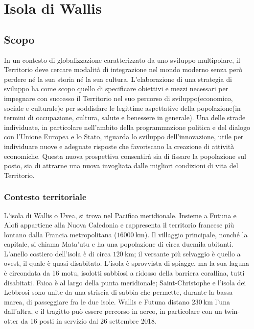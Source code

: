 \documentclass[fleqn,10pt]{SelfArx} %
\begin{document}
\maketitle 

\tableofcontents 

\thispagestyle{empty} %

\section{Isola di Wallis}

\subsection{Scopo}
In un contesto di globalizzazione caratterizzato da uno sviluppo multipolare, il Territorio deve cercare modalità di integrazione nel mondo moderno senza però perdere né la sua storia né la sua cultura.
L'elaborazione di una strategia di sviluppo ha come scopo quello di specificare obiettivi e mezzi necessari per impegnare con successo il Territorio nel suo percorso di sviluppo(economico, sociale e culturale)e per soddisfare le legittime aspettative della popolazione(in termini di occupazione, cultura, salute e benessere in generale). 
Una delle strade individuate, in particolare nell'ambito della programmazione politica e del dialogo con l'Unione Europea e lo Stato, riguarda lo sviluppo dell'innovazione, utile per individuare nuove e adeguate risposte che favoriscano la creazione di attività economiche. 
Questa nuova prospettiva consentirà sia di fissare la popolazione sul posto, sia di attrarne una nuova invogliata dalle migliori condizioni di vita del Territorio.

\subsubsection{Contesto territoriale}
L'isola di Wallis o Uvea, si trova nel Pacifico meridionale. 
Insieme a Futuna e Alofi appartiene alla Nuova Caledonia e rappresenta il territorio francese più lontano dalla Francia metropolitana ($\SI{16000}{\km}$). 
Il villaggio principale, nonché la capitale, si chiama Mata'utu e ha una popolazione di circa duemila abitanti. \\
L'anello costiero dell'isola è di circa $\SI{120}{\km}$; il versante più selvaggio è quello a ovest, il quale è quasi disabitato.
L'isola è sprovvista di spiagge, ma la sua laguna è circondata da 16 motu, isolotti sabbiosi a ridosso della barriera corallina, tutti disabitati. 
Faioa è al largo della punta meridionale; Saint-Christophe e l'isola dei Lebbrosi sono unite da una striscia di sabbia che permette, durante la bassa marea, di passeggiare fra le due isole. 
Wallis e Futuna distano $\SI{230}{\km}$ l'una dall'altra, e il tragitto può essere percorso in aereo, in particolare con un twin-otter da 16 posti in servizio dal 26 settembre 2018.
\end{document}
